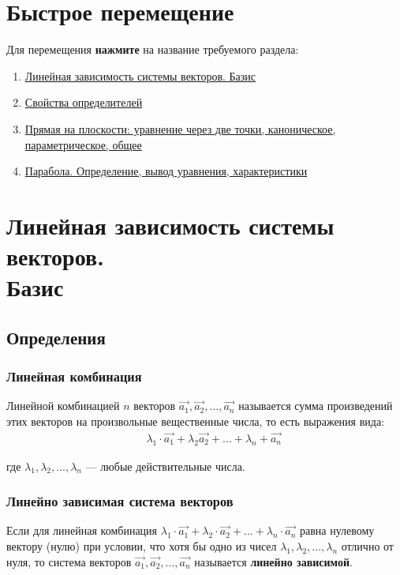 \documentclass[12pt, fleqn]{extarticle}
\begin{document}
\section*{Быстрое перемещение}

Для перемещения \textbf{нажмите} на название требуемого раздела:
\begin{enumerate}[noitemsep]
    \item \hyperref[sec:linear-dependence]{Линейная зависимость системы векторов. Базис}
    \item \hyperref[sec:det]{Свойства определителей}
    \item \hyperref[sec:line]{Прямая на плоскости: уравнение через две точки, каноническое, параметрическое, общее}
    \item \hyperref[sec:parabola]{Парабола. Определение, вывод уравнения, характеристики}
\end{enumerate}

\newpage

\section{Линейная зависимость системы векторов. \\ Базис}\label{sec:linear-dependence}

\subsection*{Определения}

\subsubsection*{Линейная комбинация}
Линейной комбинацией \(n\) векторов \(\overrightarrow{a_1}, \overrightarrow{a_2}, ..., \overrightarrow{a_n}\) называется сумма произведений этих векторов на произвольные вещественные числа, то есть выражения вида:
\begin{align*}
     &  &
    \lambda_1 \cdot \overrightarrow{a_1} + \lambda_2 \overrightarrow{a_2} + ... + \lambda_n + \overrightarrow{a_n}
\end{align*}

где \(\lambda_1, \lambda_2, ..., \lambda_n\) — любые действительные числа.

\subsubsection*{Линейно зависимая система векторов}
Если для линейная комбинация \(\lambda_1 \cdot \overrightarrow{a_1} + \lambda_2 \cdot \overrightarrow{a_2} + ... + \lambda_n \cdot \overrightarrow{a_n}\) равна нулевому вектору (нулю) при условии, что хотя бы одно из чисел \(\lambda_1, \lambda_2, ..., \lambda_n\) отлично от нуля, то система векторов \(\overrightarrow{a_1}, \overrightarrow{a_2}, ..., \overrightarrow{a_n}\) называется \textbf{линейно зависимой}.
\end{document}
